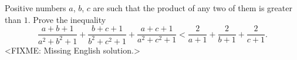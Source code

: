 \problem
Positive numbers $a$, $b$, $c$ are such that the product of any two of them is
greater than $1$.
Prove the inequality
\[
    \frac{a + b + 1}{a^2 + b^2 + 1}
    +
    \frac{b + c + 1}{b^2 + c^2 + 1}
    +
    \frac{a + c + 1}{a^2 + c^2 + 1}
<
    \frac{2}{a + 1} + \frac{2}{b + 1} + \frac{2}{c + 1}
.\]
\solution
<FIXME: Missing English solution.>
\endproblem
